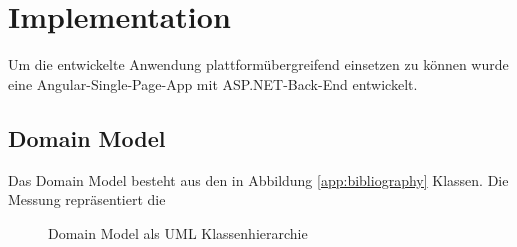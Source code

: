\chapter{Implementation}\label{ch:implementation}

Um die entwickelte Anwendung plattformübergreifend einsetzen zu können wurde eine Angular-Single-Page-App mit ASP.NET-Back-End entwickelt.

\section{Domain Model}

Das Domain Model besteht aus den in Abbildung \ref{app:bibliography} Klassen. Die Messung repräsentiert die 

\begin{figure}
\centering
{}
\caption{Domain Model als UML Klassenhierarchie}
\label{fig:domModel}
\end{figure}


